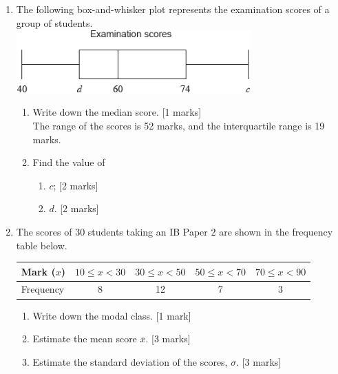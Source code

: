 \documentclass[12pt, twoside]{article}
\begin{document}
\begin{enumerate}
  \item The following box-and-whisker plot represents the examination scores of a group of students.\\
  \includegraphics[width=9cm]{2-16exam-scores-box-plot.png}
  \begin{enumerate}
    \item Write down the median score. \hfill [1 marks]\\[1.5cm]
    The range of the scores is 52 marks, and the interquartile range is 19 marks.
    \item Find the value of
    \begin{enumerate}
      \item $c$; \hfill [2 marks] \vspace{2cm}
      \item $d$. \hfill [2 marks] \vspace{2cm}
    \end{enumerate}
  \end{enumerate}

  \item The scores of 30 students taking an IB Paper 2 are shown in the frequency table below.
    
    \begin{tabular}{|l|c|c|c|c|}
      \hline
      Mark ($x$) & $10 \leq x < 30$ & $30 \leq x < 50$ & $50 \leq x < 70$ & $70 \leq x < 90$\\ 
      \hline 
      Frequency & 8 & 12 & 7 & 3\\ 
      \hline 
      \end{tabular}

    \begin{enumerate}
      \item Write down the modal class.  \hfill [1 mark]  \vspace{2cm}
      \item Estimate the mean score $\overline{x}$. \hfill [3 marks] \vspace{2cm}
      \item Estimate the standard deviation of the scores, $\sigma$.  \hfill [3 marks] \vspace{1cm}
    \end{enumerate}

\end{enumerate}
\end{document}
